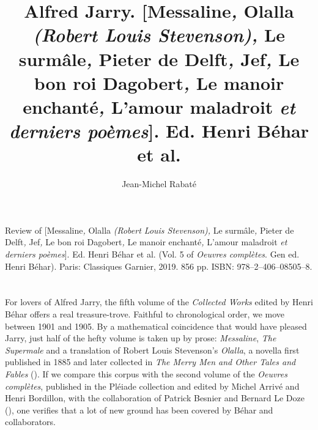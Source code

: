 \documentclass{article}
\author{Jean-Michel Rabaté}
\title{Alfred Jarry. {[}Messaline\emph{,} Olalla \emph{(Robert Louis
Stevenson),} Le surmâle\emph{,} Pieter de Delft\emph{,} Jef\emph{,} Le
bon roi Dagobert\emph{,} Le manoir enchanté\emph{,} L'amour maladroit
\emph{et derniers poèmes}{]}. Ed. Henri Béhar et al.}
\begin{document}
\maketitle


\begin{reviewed}
Review of [Messaline\emph{,} Olalla \emph{(Robert Louis
Stevenson),} Le surmâle\emph{,} Pieter de Delft\emph{,} Jef\emph{,} Le
bon roi Dagobert\emph{,} Le manoir enchanté\emph{,} L'amour maladroit
\emph{et derniers poèmes}{]}. Ed. Henri Béhar et al. (Vol. 5 of
\emph{Oeuvres complètes}. Gen ed. Henri Béhar). Paris: Classiques
Garnier, 2019. 856 pp. ISBN: 978--2--406--08505--8.
\end{reviewed}


\section*{} 
For lovers of Alfred Jarry, the fifth volume of the \emph{Collected
Works} edited by Henri Béhar offers a real treasure-trove. Faithful to
chronological order, we move between 1901 and 1905. By a mathematical
coincidence that would have pleased Jarry, just half of the hefty volume
is taken up by prose: \emph{Messaline}, \emph{The Supermale} and a
translation of Robert Louis Stevenson's \emph{Olalla}, a novella first published in 1885 and later collected in \emph{The Merry Men and Other Tales and Fables} (\citeyear{stevenson_merry_1887}). If we compare
this corpus with the second volume of the \emph{Oeuvres complètes},
published in the Pléiade collection and edited by Michel Arrivé and Henri Bordillon, with the collaboration of Patrick Besnier and Bernard Le Doze (), one verifies that a lot of new ground has
been covered by Béhar and collaborators.
\end{document}

